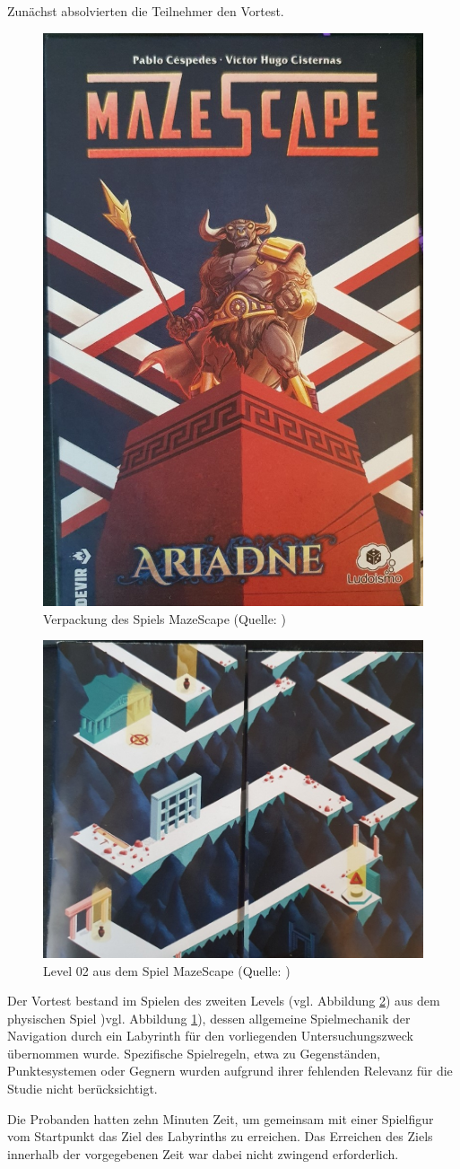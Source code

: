 Zunächst absolvierten die Teilnehmer den Vortest.

\begin{figure}[ht]
\centering
\includegraphics[width=0.3\linewidth]{content/pictures/MazeScape.jpg}
\caption{Verpackung des Spiels MazeScape (Quelle: \citealp{cespedes_mazescape_2023})}
\label{fig:mazescape}
\end{figure}

\begin{figure}[ht]
\centering
\includegraphics[width=0.5\linewidth]{content/pictures/MazeScape_Level02.jpg}
\caption{Level 02 aus dem Spiel MazeScape (Quelle: \citealp{cespedes_mazescape_2023})}
\label{fig:mazescape_level-02}
\end{figure}

Der Vortest bestand im Spielen des zweiten Levels (vgl. Abbildung \ref{fig:mazescape_level-02}) aus dem physischen Spiel  )vgl. Abbildung \ref{fig:mazescape}), dessen allgemeine Spielmechanik der Navigation durch ein Labyrinth für den vorliegenden Untersuchungszweck übernommen wurde. Spezifische Spielregeln, etwa zu Gegenständen, Punktesystemen oder Gegnern wurden aufgrund ihrer fehlenden Relevanz für die Studie nicht berücksichtigt.

Die Probanden hatten zehn Minuten Zeit, um gemeinsam mit einer Spielfigur vom Startpunkt das Ziel des Labyrinths zu erreichen. Das Erreichen des Ziels innerhalb der vorgegebenen Zeit war dabei nicht zwingend erforderlich.

